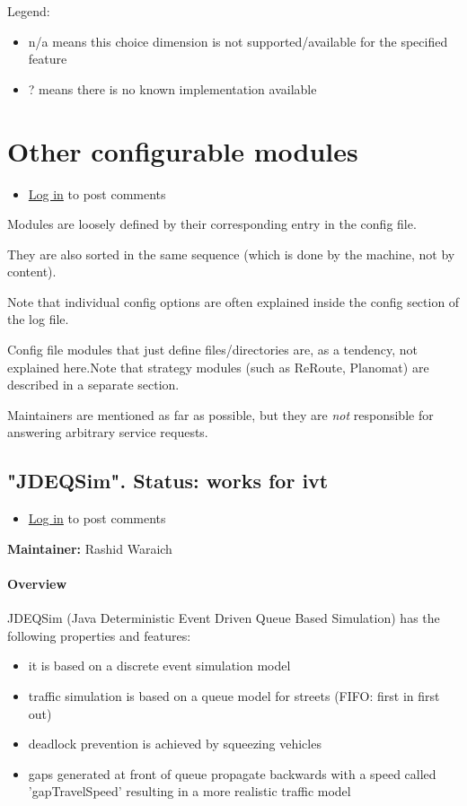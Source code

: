 \documentclass[a4paper,11pt]{report}
\begin{document}
Legend:
\begin{itemize}
	\item n/a means this choice dimension is not supported/available for the specified feature
	\item ? means there is no known implementation available
\end{itemize}

\chapter{Other configurable modules}
\begin{itemize}
	\item \href{http://www.matsim.org/user/login?destination=comment/reply/377%23comment-form}{Log in} to post comments
\end{itemize}

Modules are loosely defined by their corresponding entry in the config file.

They are also sorted in the same sequence (which is done by the machine, not by content).

Note that individual config options are often explained inside the config section of the log file.

Config file modules that just define files/directories are, as a tendency, not explained here.Note that strategy modules (such as ReRoute, Planomat) are described in a separate section.

Maintainers are mentioned as far as possible, but they are \emph{not} responsible for answering arbitrary service requests.

\vfill\eject
\section{"JDEQSim".  Status: works for ivt}
\begin{itemize}
	\item \href{http://www.matsim.org/user/login?destination=comment/reply/249%23comment-form}{Log in} to post comments
\end{itemize}

\textbf{Maintainer:} Rashid Waraich

\subsubsection{Overview}

JDEQSim (Java Deterministic Event Driven Queue Based Simulation) has the following properties and features:
\begin{itemize}
	\item it is based on a discrete event simulation model
	\item traffic simulation is based on a queue model for streets (FIFO: first in first out)
	\item deadlock prevention is achieved by squeezing vehicles
	\item gaps  generated at front of queue propagate backwards with a speed called  'gapTravelSpeed' resulting in a more realistic traffic model
\end{itemize}
\end{document}
